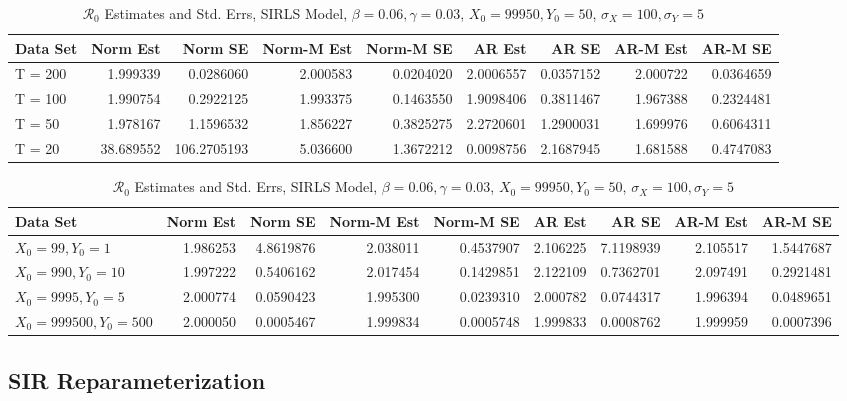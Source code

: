 \documentclass[12pt]{article}
\newcommand{\rr}{\ensuremath{\mathcal{R}_0}}
\begin{document}
\begin{table}[H]
	
	\caption{\label{tab:}$\rr$ Estimates and Std. Errs, SIRLS Model,
		$\beta = 0.06, \gamma = 0.03$, $X_0 = 99950, Y_0 = 50$, $\sigma_X = 100, \sigma_Y = 5$}
	\centering
	\begin{tabular}[t]{l|r|r|r|r|r|r|r|r}
		\hline
		Data Set & Norm Est & Norm SE & Norm-M Est & Norm-M SE & AR Est & AR SE & AR-M Est & AR-M SE\\
		\hline
		T = 200 & 1.999339 & 0.0286060 & 2.000583 & 0.0204020 & 2.0006557 & 0.0357152 & 2.000722 & 0.0364659\\
		\hline
		T = 100 & 1.990754 & 0.2922125 & 1.993375 & 0.1463550 & 1.9098406 & 0.3811467 & 1.967388 & 0.2324481\\
		\hline
		T = 50 & 1.978167 & 1.1596532 & 1.856227 & 0.3825275 & 2.2720601 & 1.2900031 & 1.699976 & 0.6064311\\
		\hline
		T = 20 & 38.689552 & 106.2705193 & 5.036600 & 1.3672212 & 0.0098756 & 2.1687945 & 1.681588 & 0.4747083\\
		\hline
	\end{tabular}
\end{table}

\begin{table}[H]
	
	\caption{\label{tab:}$\rr$ Estimates and Std. Errs, SIRLS Model,
		$\beta = 0.06, \gamma = 0.03$, $X_0 = 99950, Y_0 = 50$, $\sigma_X = 100, \sigma_Y = 5$}
	\centering
	\begin{tabular}[t]{l|r|r|r|r|r|r|r|r}
		\hline
		Data Set & Norm Est & Norm SE & Norm-M Est & Norm-M SE & AR Est & AR SE & AR-M Est & AR-M SE\\
		\hline
		$X_0 = 99, Y_0 = 1$ & 1.986253 & 4.8619876 & 2.038011 & 0.4537907 & 2.106225 & 7.1198939 & 2.105517 & 1.5447687\\
		\hline
		$X_0 = 990, Y_0 = 10$ & 1.997222 & 0.5406162 & 2.017454 & 0.1429851 & 2.122109 & 0.7362701 & 2.097491 & 0.2921481\\
		\hline
		$X_0 = 9995, Y_0 = 5$ & 2.000774 & 0.0590423 & 1.995300 & 0.0239310 & 2.000782 & 0.0744317 & 1.996394 & 0.0489651\\
		\hline
		$X_0 = 999500, Y_0 = 500$ & 2.000050 & 0.0005467 & 1.999834 & 0.0005748 & 1.999833 & 0.0008762 & 1.999959 & 0.0007396\\
		\hline
	\end{tabular}
\end{table}

\subsection{SIR Reparameterization}
\end{document}
